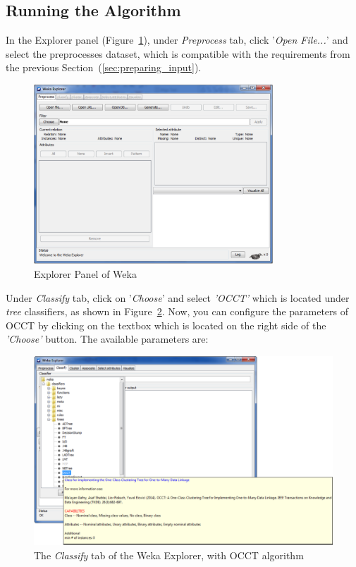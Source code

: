 \documentclass[a4paper,12pt]{article}
\begin{document}
\begin{spacing}{1.5}
\subsection{Running the Algorithm}\label{sec:running}
In the Explorer panel (Figure~\ref{fig:wekaexplorer}), under {\em Preprocess} tab, click '{\em Open File...}' and select the preprocesses dataset, which is compatible with the requirements from the previous Section~(\ref{sec:preparing_input}). 
\begin{figure}[!t]
  \centering
  \includegraphics[width=0.8\textwidth]{Figures/GUI/PDF/MainExplorer.pdf}
  \caption{Explorer Panel of Weka}
  \label{fig:wekaexplorer}
\end{figure}
Under {\em Classify} tab, click on '{\em Choose}' and select {\em 'OCCT'} which is located under {\em tree} classifiers, as shown in Figure~\ref{fig:occtPre}. Now, you can configure the parameters of OCCT by clicking on the textbox which is located on the right side of the {\em 'Choose'} button. The available parameters are:

\begin{figure}[!t]
  \centering
  \includegraphics[width=1\textwidth]{Figures/GUI/PDF/OCCTPre.pdf}\vspace{1mm}
  \caption{The {\em Classify} tab of the Weka Explorer, with OCCT algorithm}
  \label{fig:occtPre}
\end{figure}


\end{spacing}
\end{document}
